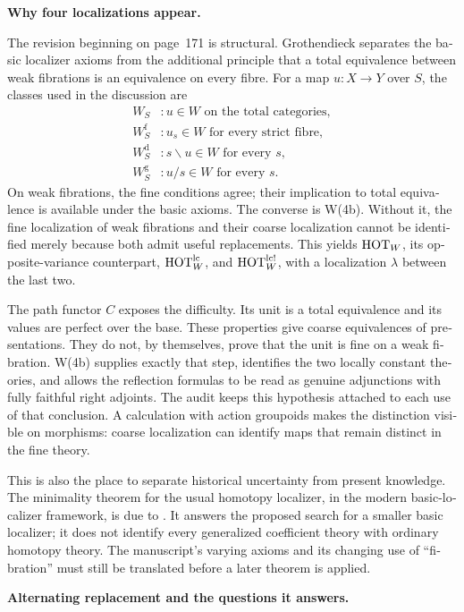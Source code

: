 \begin{otherlanguage}{english}
\medskip\noindent\textbf{Why four localizations appear.}

The revision beginning on page~171 is structural. Grothendieck separates the basic localizer axioms from the additional principle that a total equivalence between weak fibrations is an equivalence on every fibre. For a map $u:X\to Y$ over $S$, the classes used in the discussion are
\[
\begin{array}{ll}
 W_S &: u\in W\text{ on the total categories},\\
 W_S^{\mathrm f} &: u_s\in W\text{ for every strict fibre},\\
 W_S^{\mathrm d} &: s\backslash u\in W\text{ for every }s,\\
 W_S^{\mathrm g} &: u/s\in W\text{ for every }s.
\end{array}
\]
On weak fibrations, the fine conditions agree; their implication to total equivalence is available under the basic axioms. The converse is W(4b). Without it, the fine localization of weak fibrations and their coarse localization cannot be identified merely because both admit useful replacements. This yields $\mathrm{HOT}_W$, its opposite-variance counterpart, $\mathrm{HOT}_W^{\mathrm{lc}}$, and $\mathrm{HOT}_W^{\mathrm{lc}!}$, with a localization $\lambda$ between the last two.

The path functor $C$ exposes the difficulty. Its unit is a total equivalence and its values are perfect over the base. These properties give coarse equivalences of presentations. They do not, by themselves, prove that the unit is fine on a weak fibration. W(4b) supplies exactly that step, identifies the two locally constant theories, and allows the reflection formulas to be read as genuine adjunctions with fully faithful right adjoints. The audit keeps this hypothesis attached to each use of that conclusion. A calculation with action groupoids makes the distinction visible on morphisms: coarse localization can identify maps that remain distinct in the fine theory.

This is also the place to separate historical uncertainty from present knowledge. The minimality theorem for the usual homotopy localizer, in the modern basic-localizer framework, is due to \citet{Cisinski2004Minimal}. It answers the proposed search for a smaller basic localizer; it does not identify every generalized coefficient theory with ordinary homotopy theory. The manuscript's varying axioms and its changing use of ``fibration'' must still be translated before a later theorem is applied.

\medskip\noindent\textbf{Alternating replacement and the questions it answers.}


\end{otherlanguage}
